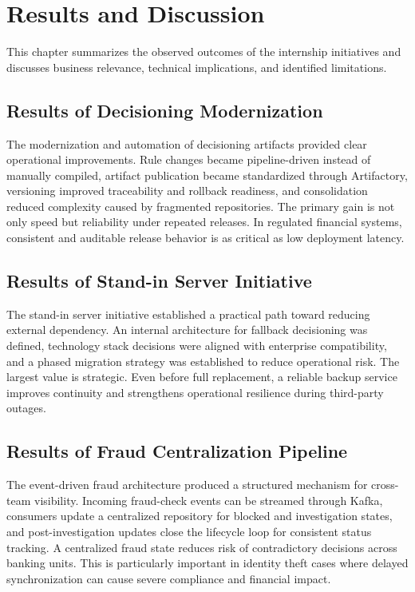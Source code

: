 \chapter{Results and Discussion}

This chapter summarizes the observed outcomes of the internship initiatives and discusses business relevance, technical implications, and identified limitations.

\section{Results of Decisioning Modernization}

The modernization and automation of decisioning artifacts provided clear operational improvements. Rule changes became pipeline-driven instead of manually compiled, artifact publication became standardized through Artifactory, versioning improved traceability and rollback readiness, and consolidation reduced complexity caused by fragmented repositories. The primary gain is not only speed but reliability under repeated releases. In regulated financial systems, consistent and auditable release behavior is as critical as low deployment latency.

\section{Results of Stand-in Server Initiative}

The stand-in server initiative established a practical path toward reducing external dependency. An internal architecture for fallback decisioning was defined, technology stack decisions were aligned with enterprise compatibility, and a phased migration strategy was established to reduce operational risk. The largest value is strategic. Even before full replacement, a reliable backup service improves continuity and strengthens operational resilience during third-party outages.

\section{Results of Fraud Centralization Pipeline}

The event-driven fraud architecture produced a structured mechanism for cross-team visibility. Incoming fraud-check events can be streamed through Kafka, consumers update a centralized repository for blocked and investigation states, and post-investigation updates close the lifecycle loop for consistent status tracking. A centralized fraud state reduces risk of contradictory decisions across banking units. This is particularly important in identity theft cases where delayed synchronization can cause severe compliance and financial impact.

